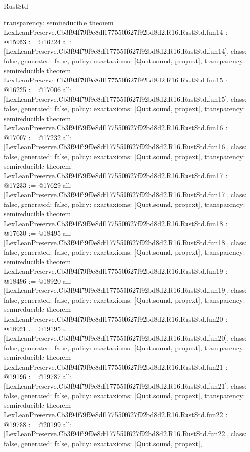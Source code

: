 \begin{lexlean}{RustStd}
\begin{coremodule}
{  transparency: semireducible
}
theorem LexLeanPreserve.Cb3f94f79f9e8df177550f627f92bd8d2.R16.RustStd.fun14 : @15953 := @16224 {
  all: [LexLeanPreserve.Cb3f94f79f9e8df177550f627f92bd8d2.R16.RustStd.fun14],
  class: false,
  generated: false,
  policy: exact{axioms: [Quot.sound, propext]},
  transparency: semireducible
}
theorem LexLeanPreserve.Cb3f94f79f9e8df177550f627f92bd8d2.R16.RustStd.fun15 : @16225 := @17006 {
  all: [LexLeanPreserve.Cb3f94f79f9e8df177550f627f92bd8d2.R16.RustStd.fun15],
  class: false,
  generated: false,
  policy: exact{axioms: [Quot.sound, propext]},
  transparency: semireducible
}
theorem LexLeanPreserve.Cb3f94f79f9e8df177550f627f92bd8d2.R16.RustStd.fun16 : @17007 := @17232 {
  all: [LexLeanPreserve.Cb3f94f79f9e8df177550f627f92bd8d2.R16.RustStd.fun16],
  class: false,
  generated: false,
  policy: exact{axioms: [Quot.sound, propext]},
  transparency: semireducible
}
theorem LexLeanPreserve.Cb3f94f79f9e8df177550f627f92bd8d2.R16.RustStd.fun17 : @17233 := @17629 {
  all: [LexLeanPreserve.Cb3f94f79f9e8df177550f627f92bd8d2.R16.RustStd.fun17],
  class: false,
  generated: false,
  policy: exact{axioms: [Quot.sound, propext]},
  transparency: semireducible
}
theorem LexLeanPreserve.Cb3f94f79f9e8df177550f627f92bd8d2.R16.RustStd.fun18 : @17630 := @18495 {
  all: [LexLeanPreserve.Cb3f94f79f9e8df177550f627f92bd8d2.R16.RustStd.fun18],
  class: false,
  generated: false,
  policy: exact{axioms: [Quot.sound, propext]},
  transparency: semireducible
}
theorem LexLeanPreserve.Cb3f94f79f9e8df177550f627f92bd8d2.R16.RustStd.fun19 : @18496 := @18920 {
  all: [LexLeanPreserve.Cb3f94f79f9e8df177550f627f92bd8d2.R16.RustStd.fun19],
  class: false,
  generated: false,
  policy: exact{axioms: [Quot.sound, propext]},
  transparency: semireducible
}
theorem LexLeanPreserve.Cb3f94f79f9e8df177550f627f92bd8d2.R16.RustStd.fun20 : @18921 := @19195 {
  all: [LexLeanPreserve.Cb3f94f79f9e8df177550f627f92bd8d2.R16.RustStd.fun20],
  class: false,
  generated: false,
  policy: exact{axioms: [Quot.sound, propext]},
  transparency: semireducible
}
theorem LexLeanPreserve.Cb3f94f79f9e8df177550f627f92bd8d2.R16.RustStd.fun21 : @19196 := @19787 {
  all: [LexLeanPreserve.Cb3f94f79f9e8df177550f627f92bd8d2.R16.RustStd.fun21],
  class: false,
  generated: false,
  policy: exact{axioms: [Quot.sound, propext]},
  transparency: semireducible
}
theorem LexLeanPreserve.Cb3f94f79f9e8df177550f627f92bd8d2.R16.RustStd.fun22 : @19788 := @20199 {
  all: [LexLeanPreserve.Cb3f94f79f9e8df177550f627f92bd8d2.R16.RustStd.fun22],
  class: false,
  generated: false,
  policy: exact{axioms: [Quot.sound, propext]},
}
\end{coremodule}
\end{lexlean}
